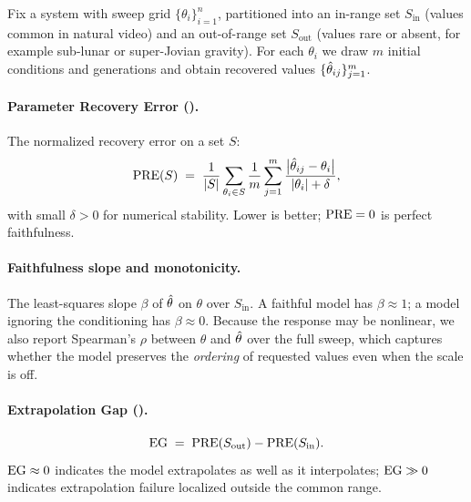 Fix a system with sweep grid $\{\theta_i\}_{i=1}^{n}$, partitioned into an
in-range set $S_\text{in}$ (values common in natural video) and an
out-of-range set $S_\text{out}$ (values rare or absent, for example sub-lunar
or super-Jovian gravity). For each $\theta_i$ we draw $m$ initial conditions
and generations and obtain recovered values $\{\hat{\theta}_{ij}\}_{j=1}^{m}$.

\paragraph{Parameter Recovery Error (\PRE).}
The normalized recovery error on a set $S$:
\begin{equation}
\mathrm{PRE}(S) \;=\; \frac{1}{|S|}\sum_{\theta_i\in S}
   \frac{1}{m}\sum_{j=1}^{m}
   \frac{\big|\hat{\theta}_{ij}-\theta_i\big|}{|\theta_i|+\delta},
\end{equation}
with small $\delta>0$ for numerical stability. Lower is better; $\mathrm{PRE}=0$ is
perfect faithfulness.

\paragraph{Faithfulness slope and monotonicity.}
The least-squares slope $\beta$ of $\hat{\theta}$ on $\theta$ over $S_\text{in}$.
A faithful model has $\beta\approx 1$; a model ignoring the conditioning has
$\beta\approx 0$. Because the response may be nonlinear, we also report
Spearman's $\rho$ between $\theta$ and $\hat{\theta}$ over the full sweep, which
captures whether the model preserves the \emph{ordering} of requested values
even when the scale is off.

\paragraph{Extrapolation Gap (\EG).}
\begin{equation}
\mathrm{EG} \;=\; \mathrm{PRE}(S_\text{out}) - \mathrm{PRE}(S_\text{in}).
\end{equation}
$\mathrm{EG}\approx 0$ indicates the model extrapolates as well as it interpolates;
$\mathrm{EG}\gg 0$ indicates extrapolation failure localized outside the common range.

